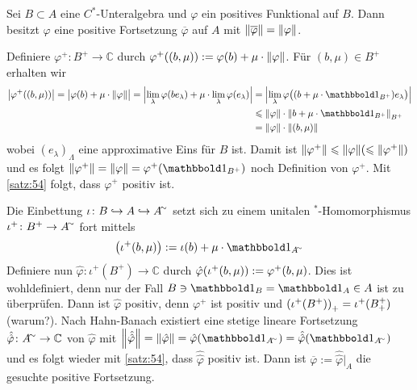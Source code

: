 \begin{satz}[label=satz:57,{name=[positive Fortsetzung positiver Funktionale]}]
	Sei $B \subset A$ eine $C^*$-Unteralgebra und $\varphi$ ein positives Funktional auf $B$. 
	Dann besitzt $\varphi$ eine positive Fortsetzung $\overline{\varphi}$ auf $A$ mit $\norm*{\overline{\varphi}} = \norm*{\varphi}$.
\end{satz}
\begin{beweis}
	Definiere $\varphi^+ \colon B^+ \to \mathbb{C}$ durch $\varphi^+ \enbrace*{(b,\mu)} := \varphi(b) + \mu \cdot \norm*{\varphi}$.
	Für $(b,\mu) \in B^+$ erhalten wir 
	\begin{align}
		\abs*{\varphi^+ \enbrace*{(b,\mu)}} = \abs[\big]{\varphi(b) + \mu \cdot \norm*{\varphi}} = \abs[\Big]{\lim_\lambda \varphi \enbrace*{b e_\lambda} + \mu \cdot \lim_\lambda \varphi(e_\lambda) } &= \abs[\Big]{\lim_\lambda \varphi \enbrace[\big]{(b+ \mu \cdot \ind_{B^+})e_\lambda}} \\
		&\le \norm*{\varphi} \cdot  \norm*{b+ \mu \cdot \ind_{B^+}}_{B^+} \\
		&= \norm*{\varphi} \cdot \norm*{(b,\mu)}
	\end{align}
	wobei $(e_\lambda)_\Lambda$ eine approximative Eins für $B$ ist. 
	Damit ist $\norm*{\varphi^+} \le \norm*{\varphi} \enbrace*{\le \norm*{\varphi^+}}$ und es folgt $\norm*{\varphi^+}=\norm*{\varphi}=\varphi^+(\ind_{B^+})$ noch Definition von $\varphi^+$.
	Mit \autoref{satz:54} folgt, dass $\varphi^+$ positiv ist.
	
	Die Einbettung $\iota \colon B \hookrightarrow A \hookrightarrow A^\simm$ setzt sich zu einem unitalen $^*$-Homomorphismus $\iota^+ \colon B^+ \to A^\simm$ fort mittels
	\[
		\enbrace*{\iota^+ \enbrace*{b,\mu}} := \iota(b) + \mu \cdot \ind_{A^\simm}
	\]
	Definiere nun $\hat{\varphi} \colon \iota^+(B^+) \to \mathbb{C}$ durch $\hat{\varphi} \enbrace*{\iota^+(b,\mu)} := \varphi^+(b,\mu)$. 
	Dies ist wohldefiniert, denn nur der Fall $B\ni \ind_B= \ind_A \in A$ ist zu überprüfen.
	Dann ist $\hat{\varphi}$ positiv, denn $\varphi^+$ ist positiv und $\enbrace*{\iota^+(B^+)}_+ = \iota^+(B^+_+) $ (warum?).
	Nach Hahn-Banach existiert eine stetige lineare Fortsetzung $\hat{\hat{\varphi}} \colon A^\simm  \to \mathbb{C}$ von $\hat{\varphi}$ mit $\norm*{\hat{\hat{\varphi}}}=\norm*{\hat{\varphi}}=\hat{\varphi}(\ind_{A^\simm})= \hat{\hat{\varphi}}(\ind_{A^\simm})$ und es folgt wieder mit \autoref{satz:54}, dass $\hat{\hat{\varphi}}$ positiv ist.
	Dann ist $\overline{\varphi} := \hat{\hat{\varphi}}|_A$ die gesuchte positive Fortsetzung. 
\end{beweis}

